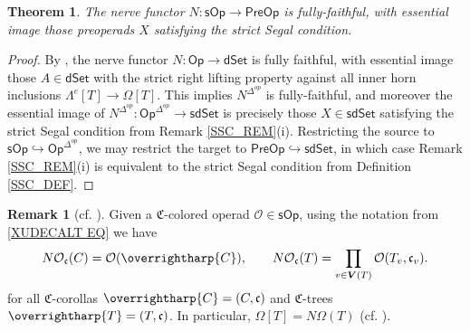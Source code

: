 \documentclass[a4paper,10pt
,draft
]{article}%
\numberwithin{equation}{section}
\numberwithin{figure}{section}
\newtheorem{theorem}[equation]{Theorem}%
\theoremstyle{definition} %
\newtheorem{remark}[equation]{Remark}%
\newcommand{\vect}[1]{\text{\overrightharp{\ensuremath{#1}}}}
\newcommand{\Op}{\mathsf{Op}}%
\newcommand{\sOp}{\ensuremath{\mathsf{sOp}}}%
\newcommand{\dSet}{\mathsf{dSet}}
\newcommand{\sdSet}{\mathsf{sdSet}}
\newcommand{\PreOp}{\mathsf{PreOp}}
\renewcommand{\O}{\ensuremath{\mathcal O}}
\newcommand{\1}{\ensuremath{\mathbbm 1}}%
\begin{document}
{\begin{theorem}
        \label{SSC_THM}
        The nerve functor $N \colon \sOp \to \PreOp$
        is fully-faithful, with essential image
        those preoperads $X$ satisfying the strict Segal condition.
\end{theorem}
\begin{proof}
        By \cite[Prop. 5.3 and Thm. 6.1]{MW09},
        the nerve functor
        $N \colon \Op \to \dSet$
        is fully faithful, with essential image
        those $A \in \dSet$ with the strict right lifting property against all inner horn inclusions $\Lambda^e[T] \to \Omega[T]$.
        This implies $N^{\Delta^{op}}$ is fully-faithful, and moreover
        the essential image of $N^{\Delta^{op}} \colon \Op^{\Delta^{op}} \to \sdSet$ is precisely
        those $X \in \sdSet$ satisfying the strict Segal condition from Remark \ref{SSC_REM}(i).
        Restricting the source to $\sOp \hookrightarrow \Op^{\Delta^{op}}$, we may restrict the target to $\PreOp \hookrightarrow \sdSet$,
        in which case Remark \ref{SSC_REM}(i) is equivalent to the strict Segal condition from Definition \ref{SSC_DEF}.
\end{proof}


\begin{remark}[{cf. \cite[ (\ref{TAS-STRSEGCON EQ})]{BP_TAS}}]
        \label{NERVEEVAL_REM}
        Given a $\mathfrak C$-colored operad $\O \in \sOp$, using the notation from \eqref{XUDECALT EQ} we have
        \[
                N\O_{\mathfrak c}(C) = \O(\vect C),
                \qquad
                N \O_{\mathfrak c}(T) = \prod_{v \in \boldsymbol{V}(T)} \O(T_v, \mathfrak c_v).
        \]
        for all $\mathfrak C$-corollas $\vect C = (C, \mathfrak c)$ and
        $\mathfrak C$-trees $\vect T = (T, \mathfrak c)$.
        In particular, $\Omega[T] = N\Omega(T)$ (cf. \cite[Rem. \ref{TAS-NERVESIMDES REM}]{BP_TAS}).
\end{remark}




}
\end{document}
